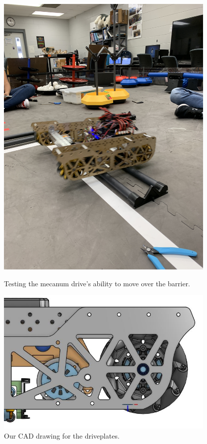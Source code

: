 \begin{figure}[ht]
\centering
\begin{minipage}[b]{.48\textwidth}
  \centering
  \includegraphics[width=0.95\textwidth]{Meetings/September/09-30-21/9-30-21_Hardware_Image3 - Nathan Forrer.JPG}
  \caption{Testing the mecanum drive's ability to move over the barrier.}
  \label{fig:pic1}
\end{minipage}%
\hfill%
\begin{minipage}[b]{.48\textwidth}
  \centering
  \includegraphics[width=0.95\textwidth]{Meetings/September/09-30-21/9-30-21_Hardware_Image4 - Nathan Forrer.JPG}
  \caption{Our CAD drawing for the driveplates.}
  \label{fig:pic2}
\end{minipage}
\end{figure}